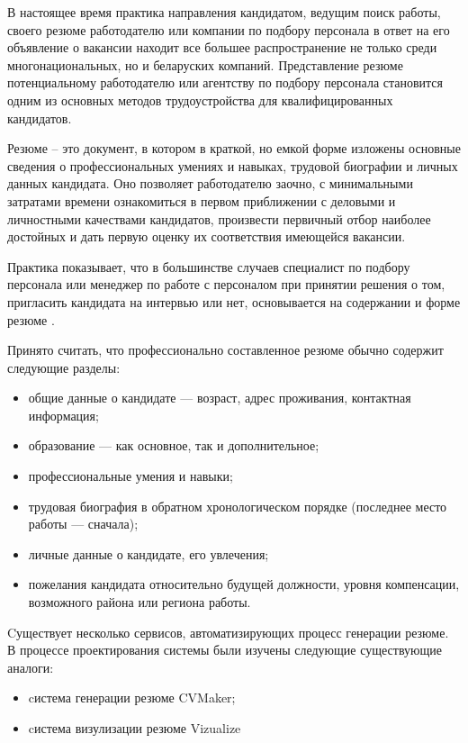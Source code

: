 В настоящее время практика направления кандидатом, ведущим поиск работы, своего резюме работодателю или компании по
подбору персонала в ответ на его объявление о вакансии находит все большее распространение не только среди
многонациональных, но и беларуских компаний. Представление резюме потенциальному работодателю или агентству по подбору
персонала становится одним из основных методов трудоустройства для квалифицированных кандидатов.

Резюме -- это документ, в котором в краткой, но емкой форме изложены основные сведения о профессиональных умениях и
навыках, трудовой биографии и личных данных кандидата. Оно позволяет работодателю заочно, с минимальными затратами
времени ознакомиться в первом приближении с деловыми и личностными качествами кандидатов, произвести первичный отбор
наиболее достойных и дать первую оценку их соответствия имеющейся вакансии.

Практика показывает, что в большинстве случаев специалист по подбору персонала или менеджер по работе с персоналом при
принятии решения о том, пригласить кандидата на интервью или нет, основывается на содержании и форме резюме \cite{cv}.

Принято считать, что профессионально составленное резюме обычно содержит следующие разделы:
\begin{itemize}
	\item общие данные о кандидате — возраст, адрес проживания, контактная информация;
	\item образование — как основное, так и дополнительное;
	\item профессиональные умения и навыки;
	\item трудовая биография в обратном хронологическом порядке (последнее место работы — сначала);
	\item личные данные о кандидате, его увлечения;
	\item пожелания кандидата относительно будущей должности, уровня компенсации, возможного района или региона работы.
\end{itemize}

Cуществует несколько сервисов, автоматизирующих процесс генерации резюме. В процессе проектирования
системы были изучены следующие существующие аналоги:
\begin{itemize}
	\item cистема генерации резюме CVMaker;
	\item cистема визулизации резюме Vizualize
\end{itemize}

